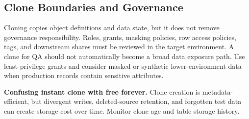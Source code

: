 \subsection{Clone Boundaries and Governance}
Cloning copies object definitions and data state, but it does not remove governance responsibility. Roles, grants, masking policies, row access policies, tags, and downstream shares must be reviewed in the target environment. A clone for QA should not automatically become a broad data exposure path. Use least-privilege grants and consider masked or synthetic lower-environment data when production records contain sensitive attributes.
\begin{pitfall}
\textbf{Confusing instant clone with free forever.} Clone creation is metadata-efficient, but divergent writes, deleted-source retention, and forgotten test data can create storage cost over time. Monitor clone age and table storage history.
\end{pitfall}
